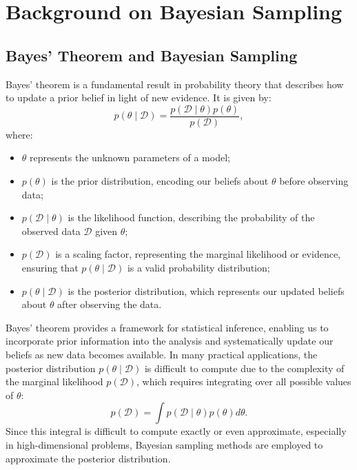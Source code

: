 \documentclass[11pt, twoside]{report}
\begin{document}
\chapter{Background on Bayesian Sampling}
\section{Bayes' Theorem and Bayesian Sampling}
Bayes' theorem is a fundamental result in probability theory that describes how to update a prior belief in light of new evidence. It is given by:
\begin{equation}
p(\theta \mid \mathcal{D}) = \frac{p(\mathcal{D} \mid \theta) p(\theta)}{p(\mathcal{D})},
\end{equation}
where:
\begin{itemize}
\item $\theta$ represents the unknown parameters of a model;
\item $p(\theta)$ is the prior distribution, encoding our beliefs about $\theta$ before observing data;
\item $p(\mathcal{D} \mid \theta)$ is the likelihood function, describing the probability of the observed data $\mathcal{D}$ given $\theta$;
\item $p(\mathcal{D})$ is a scaling factor, representing the marginal likelihood or evidence, ensuring that $p(\theta \mid \mathcal{D})$ is a valid probability distribution;
\item $p(\theta \mid \mathcal{D})$ is the posterior distribution, which represents our updated beliefs about $\theta$ after observing the data.
\end{itemize}
Bayes' theorem provides a framework for statistical inference, enabling us to incorporate prior information into the analysis and systematically update our beliefs as new data becomes available. In many practical applications, the posterior distribution $p(\theta \mid \mathcal{D})$ is difficult to compute due to the complexity of the marginal likelihood $p(\mathcal{D})$, which requires integrating over all possible values of $\theta$:
\begin{equation}
p(\mathcal{D}) = \int p(\mathcal{D} \mid \theta) p(\theta) d\theta.
\end{equation}
Since this integral is difficult to compute exactly or even approximate, especially in high-dimensional problems, Bayesian sampling methods are employed to approximate the posterior distribution.
\end{document}
